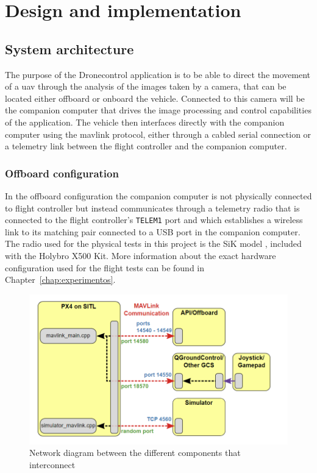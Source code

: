 \chapter{Design and implementation}
\label{chap:design}

\section{System architecture}

The purpose of the Dronecontrol application is to be able to direct the movement of a \gls{uav} through the analysis of the images taken by a camera, that can be located either offboard or onboard the vehicle. 
Connected to this camera will be the companion computer that drives the image processing and control capabilities of the application.
The vehicle then interfaces directly with the companion computer using the \gls{mavlink} protocol, either through a cabled serial connection or a telemetry link between the flight controller and the companion computer.

\subsection{Offboard configuration}

In the offboard configuration the companion computer is not physically connected to flight controller but instead communicates through a telemetry radio that is connected to the flight controller's \verb|TELEM1| port and which establishes a wireless link to its matching pair connected to a USB port in the companion computer.
The radio used for the physical tests in this project is the SiK model , included with the Holybro X500 Kit.
More information about the exact hardware configuration used for the flight tests can be found in Chapter~\ref{chap:experimentos}.

\begin{figure}
  \centering
  \includegraphics[keepaspectratio]{img/px4_ports.png}
  \caption{Network diagram between the different components that interconnect}\label{fig:px4_ports}
\end{figure}

